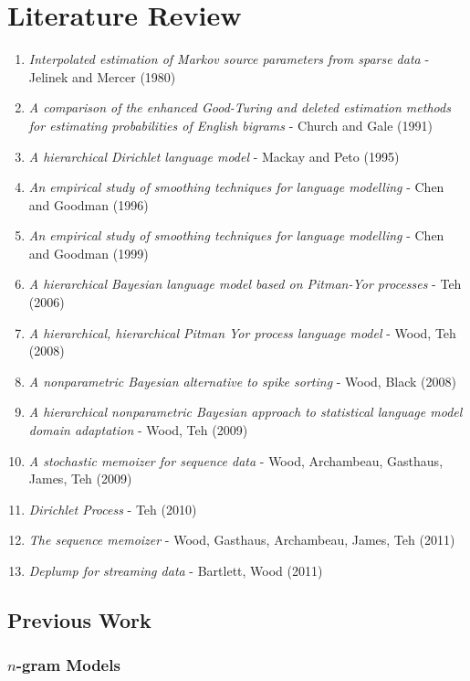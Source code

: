 \chapter{Literature Review}\label{chap:literatureReview}

\begin{enumerate}
\item \textit{Interpolated estimation of Markov source parameters from sparse data} - Jelinek and Mercer (1980)
\item \textit{A comparison of the enhanced Good-Turing and deleted estimation    methods for estimating probabilities of English bigrams} - Church and Gale (1991)
\item \textit{A hierarchical Dirichlet language model} - Mackay and Peto (1995)
\item \textit{An empirical study of smoothing techniques for language modelling} - Chen and Goodman (1996)
\item \textit{An empirical study of smoothing techniques for language modelling} - Chen and Goodman (1999)
\item \textit{A hierarchical Bayesian language model based on Pitman-Yor processes} - Teh (2006)
\item \textit{A hierarchical, hierarchical Pitman Yor process language model} - Wood, Teh (2008)
\item \textit{A nonparametric Bayesian alternative to spike sorting} - Wood, Black (2008)
\item \textit{A hierarchical nonparametric    Bayesian approach to statistical language model domain adaptation} - Wood, Teh (2009)
\item \textit{A stochastic memoizer for sequence data} - Wood, Archambeau, Gasthaus, James, Teh (2009)
\item \textit{Dirichlet Process} - Teh (2010)
\item \textit{The sequence memoizer} - Wood, Gasthaus, Archambeau, James, Teh (2011)
\item \textit{Deplump for streaming data} - Bartlett, Wood (2011)
\end{enumerate}

\section{Previous Work}

\subsection{$n$-gram Models}

